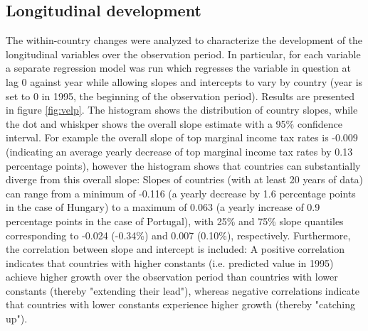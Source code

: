 \documentclass[11pt, authoryear]{elsarticle}
\begin{document}
\subsection{Longitudinal development}
\label{app_velp}
The within-country changes were analyzed to characterize the development of the longitudinal variables over the observation period.
In particular, for each variable a separate regression model was run which regresses the variable in question at lag 0 against year while allowing slopes and intercepts to vary by country (year is set to 0 in 1995, the beginning of the observation period).
Results are presented in figure \ref{fig:velp}.
The histogram shows the distribution of country slopes, while the dot and whiskper shows the overall slope estimate with a 95\% confidence interval.
For example the overall slope of top marginal income tax rates is -0.009 (indicating an average yearly decrease of top marginal income tax rates by 0.13 percentage points), however the histogram shows that countries can substantially diverge from this overall slope: 
Slopes of countries (with at least 20 years of data) can range from a minimum of -0.116 (a yearly decrease by 1.6 percentage points in the case of Hungary) to a maximum of 0.063 (a yearly increase of 0.9 percentage points in the case of Portugal), with 25\% and 75\% slope quantiles corresponding to -0.024 (-0.34\%) and 0.007 (0.10\%), respectively.
Furthermore, the correlation between slope and intercept is included:
A positive correlation indicates that countries with higher constants (i.e. predicted value in 1995) achieve higher growth over the observation period than countries with lower constants (thereby "extending their lead"), whereas negative correlations indicate that countries with lower constants experience higher growth (thereby "catching up").
\end{document}
